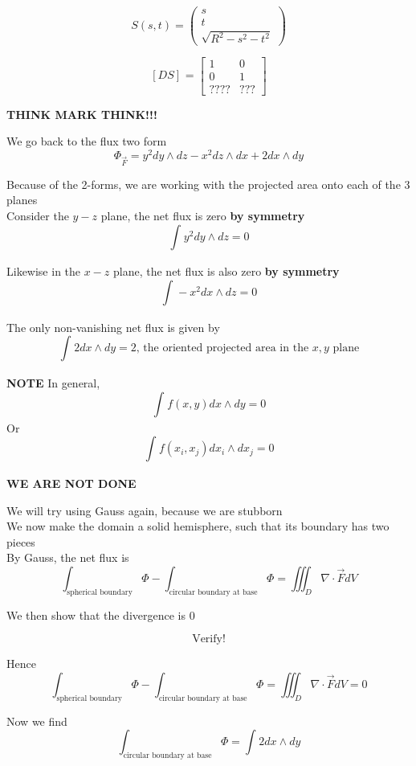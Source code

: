 \[
  S(s, t) = \begin{pmatrix} s \\ t \\ \sqrt{R^2 - s^2 - t^2} \end{pmatrix} 
\] 

\[
   \left[ D S \right]_{}  = \begin{bmatrix} 
      1 & 0 \\
      0 & 1 \\
      ???? & ???
   \end{bmatrix}
\] 

\textbf{THINK MARK THINK!!!}

We go back to the flux two form
\[
   \Phi_{\vec{F}} = y^2 dy \wedge dz - x^2 dz \wedge dx + 2 dx \wedge dy
\] 

Because of the 2-forms, we are working with the projected area onto each of the 3 planes \\

Consider the $y-z$ plane, the net flux is zero \textbf{by symmetry}
\[
   \int_{}^{}  y^2 dy\wedge dz = 0
\] 

Likewise in the $x-z$ plane, the net flux is also zero \textbf{by symmetry}
\[
   \int_{}^{}  -x^2 dx\wedge dz = 0
\] 

The only non-vanishing net flux is given by
\[
   \int_{}^{}  2 dx\wedge dy = 2 \text{, the oriented projected area in the $x, y $ plane} 
\] 

\textbf{NOTE}
In general, \[
  \int_{}^{} f(x, y) dx \wedge dy  = 0
\] 
Or
\[
  \int_{}^{} f(x_i, x_j) dx_i \wedge dx_j = 0 
\] 

\textbf{WE ARE NOT DONE}

We will try using Gauss again, because we are stubborn \\

We now make the domain a solid hemisphere, such that its boundary has two pieces \\

By Gauss, the net flux is 
\[
   \int_{\text{spherical boundary}}^{} \Phi - \int_{\text{circular boundary at base}}^{}  \Phi  = \iiint_{D} \nabla \cdot \vec{F} dV 
\] 

We then show that the divergence is 0

\[
   \text{Verify!}
\] 

Hence 
\[
   \int_{\text{spherical boundary}}^{} \Phi - \int_{\text{circular boundary at base}}^{} \Phi   = \iiint_{D} \nabla \cdot \vec{F} dV  = 0
\] 

Now we find
\[
   \int_{\text{circular boundary at base}}^{} \Phi = \int_{}^{} 2 dx \wedge dy 
\] 

